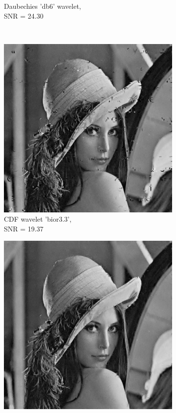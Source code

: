 \begin{figure}
\begin{subfigure}[b]{0.4\textwidth}
        \caption{Daubechies 'db6' wavelet, \\ SNR = 24.30 }
        \label{fig:matti_fig_db6}
    \end{subfigure}
    ~ %
    \begin{subfigure}[b]{0.4\textwidth}
        \includegraphics[width=\textwidth]{../src/inpainting/vraag_2_4_bior33}
        \caption{ CDF wavelet 'bior3.3', \\ SNR = 19.37 }
        \label{fig:matti_fig_bior33}
    \end{subfigure}
        \begin{subfigure}[b]{0.4\textwidth}
        \includegraphics[width=\textwidth]{../src/inpainting/vrag_2_4_coif4}

\end{subfigure}
\end{figure}
